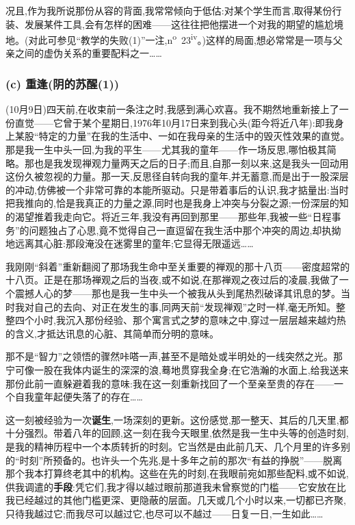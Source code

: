 况且,作为我所说那份从容的背面,我常常倾向于低估:对某个学生而言,取得某份行装、发展某件工具,会有怎样的困难——这往往把他摆进一个对我的期望的尴尬境地。(对此可参见“教学的失败(1)”一注,n\textsuperscript{o}~23\textsuperscript{iv}。)这样的局面,想必常常是一项与父亲之间的虚伪关系的重要配料之一……

\subsubsection*{(c) 重逢(阴的苏醒(1))}
\label{ch18:local:h9}

\label{ch18:local:n9}

(10月9日)四天前,在收束前一条注之时,我感到满心欢喜。我不期然地重新接上了一份直觉——它曾于某个星期日,1976年10月17日来到我心头(距今将近八年):即我身上某股“特定的力量”在我的生活中、一如在我母亲的生活中的毁灭性效果的直觉。那是我一生中头一回,为我的平生——尤其我的童年——作一场反思,哪怕极其简略。那也是我发现禅观力量两天之后的日子;而且,自那一刻以来,这是我头一回动用这份久被忽视的力量。那一天,反思径自转向我的童年,并无蓄意,而是出于一股深层的冲动,仿佛被一个非常可靠的本能所驱动。只是带着事后的认识,我才掂量出:当时把我推向的,恰是我真正的力量之源,同时也是我身上冲突与分裂之源;一份深层的知的渴望推着我走向它。将近三年,我没有再回到那里——那些年,我被一些“日程事务”的问题独占了心思,竟不觉得自己一直逗留在我生活中那个冲突的周边,却执拗地远离其心脏:那段淹没在迷雾里的童年;它显得无限遥远……

我刚刚“斜着”重新翻阅了那场我生命中至关重要的禅观的那十八页——密度超常的十八页。正是在那场禅观之后的当夜,或不如说,在那禅观之夜过后的凌晨,我做了一个震撼人心的梦——那也是我一生中头一个被我从头到尾热烈破译其讯息的梦。当时我对自己的去向、对正在发生的事,同两天前“发现禅观”之时一样,毫无所知。\dmark{}整整四个小时,我沉入那份经验、那个寓言式之梦的意味之中,穿过一层层越来越灼热的含义,才抵达讯息的心脏、其简单而分明的意味。

那不是“智力”之领悟的骤然咔嗒一声,甚至不是暗处或半明处的一线突然之光。那宁可像一股在我体内诞生的深深的浪,蓦地贯穿我全身;在它浩瀚的水面上,给我送来那份此前一直躲避着我的意味:我在这一刻重新找回了一个至亲至贵的存在——一个自我童年起便失落了的存在……

这一刻被经验为一次\textbf{诞生},一场深刻的更新。这份感觉,那一整天、其后的几天里,都十分强烈。带着八年的回顾,这一刻在我今天眼里,依然是我一生中头等的创造时刻,是我的精神历程中一个本质转折的时刻。它当然是由此前几天、几个月里的许多别的“时刻”所预备的。也许头一个先兆,是十多年之前的那次“有益的挣脱”——脱离那个我本打算终老其中的机构。这些在先的时刻,在我眼前宛如那些配料,或不如说,供我调遣的\textbf{手段}:凭它们,我才得以越过眼前那道我未曾察觉的门槛——它安放在比我已经越过的其他门槛更深、更隐蔽的层面。几天或几个小时以来,一切都已齐聚,只待我越过它;而我尽可以越过它,也尽可以不越过——日复一日,一生如此……

